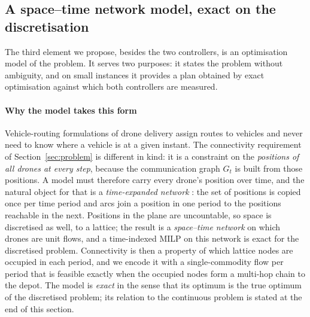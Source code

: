 \documentclass[final,5p,times,twocolumn]{elsarticle}
\begin{document}
\subsection{A space--time network model, exact on the discretisation}
\label{sec:milp-model}

The third element we propose, besides the two controllers, is an optimisation model of the
problem. It serves two purposes: it states the problem without ambiguity, and on small instances
it provides a plan obtained by exact optimisation against which both controllers are measured.

\paragraph{Why the model takes this form}
Vehicle-routing formulations of drone delivery \cite{murray2015,agatz2018} assign routes to
vehicles and never need to know where a vehicle is at a given instant. The connectivity
requirement of Section~\ref{sec:problem} is different in kind: it is a constraint on the
\emph{positions of all drones at every step}, because the communication graph $G_t$ is built from
those positions. A model must therefore carry every drone's position over time, and the natural
object for that is a \emph{time-expanded network} \cite{ford1962}: the set of positions is copied
once per time period and arcs join a position in one period to the positions reachable in the
next. Positions in the plane are uncountable, so space is discretised as well, to a lattice; the
result is a \emph{space--time network} on which drones are unit flows, and a time-indexed MILP on
this network is exact for the discretised problem. Connectivity is then a property of which
lattice nodes are occupied in each period, and we encode it with a single-commodity flow per
period that is feasible exactly when the occupied nodes form a multi-hop chain to the depot. The
model is \emph{exact} in the sense that its optimum is the true optimum of the discretised
problem; its relation to the continuous problem is stated at the end of this section.
\end{document}
